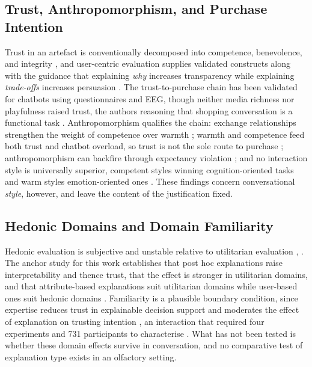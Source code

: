 \documentclass[conference]{IEEEtran}
\begin{document}
\subsection{Trust, Anthropomorphism, and Purchase Intention}

Trust in an artefact is conventionally decomposed into competence, benevolence, and
integrity \cite{mcknight2002}, and user-centric evaluation supplies validated constructs
along with the guidance that explaining \textit{why} increases transparency while
explaining \textit{trade-offs} increases persuasion \cite{pu2012}. The trust-to-purchase
chain has been validated for chatbots using questionnaires and EEG, though neither media
richness nor playfulness raised trust, the authors reasoning that shopping conversation is
a functional task \cite{yen2021}. Anthropomorphism qualifies the chain: exchange
relationships strengthen the weight of competence over warmth \cite{cheng2022}; warmth and
competence feed both trust and chatbot overload, so trust is not the sole route to purchase
\cite{liyang2025}; anthropomorphism can backfire through expectancy violation
\cite{crolic2022}; and no interaction style is universally superior, competent styles
winning cognition-oriented tasks and warm styles emotion-oriented ones \cite{libaoku2024}.
These findings concern conversational \textit{style}, however, and leave the content of the
justification fixed.

\subsection{Hedonic Domains and Domain Familiarity}

Hedonic evaluation is subjective and unstable relative to utilitarian evaluation
\cite{wangx2022}, \cite{varga2024}. The anchor study for this work establishes that post hoc
explanations raise interpretability and thence trust, that the effect is stronger in
utilitarian domains, and that attribute-based explanations suit utilitarian domains while
user-based ones suit hedonic domains \cite{chen2024}. Familiarity is a plausible boundary
condition, since expertise reduces trust in explainable decision support and moderates the
effect of explanation on trusting intention \cite{bayer2023}, an interaction that required
four experiments and 731 participants to characterise \cite{celar2023}. What has not been
tested is whether these domain effects survive in conversation, and no comparative test of
explanation type exists in an olfactory setting.
\end{document}
